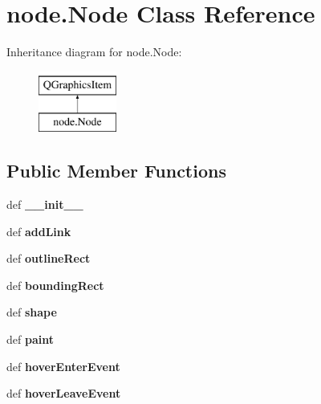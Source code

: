 \hypertarget{classnode_1_1Node}{\section{node.\-Node Class Reference}
\label{classnode_1_1Node}
}
Inheritance diagram for node.\-Node\-:\begin{figure}[H]
\begin{center}
\leavevmode
\includegraphics[height=2.000000cm]{classnode_1_1Node}
\end{center}
\end{figure}
\subsection*{Public Member Functions}
\begin{DoxyCompactItemize}
\item 
\hypertarget{classnode_1_1Node_a86b4ae5dcdb995a5e2bba666f293ee09}{def {\bfseries \-\_\-\-\_\-init\-\_\-\-\_\-}}\label{classnode_1_1Node_a86b4ae5dcdb995a5e2bba666f293ee09}

\item 
\hypertarget{classnode_1_1Node_a44ba0bb4fbf7cb938914fde718b95eaf}{def {\bfseries add\-Link}}\label{classnode_1_1Node_a44ba0bb4fbf7cb938914fde718b95eaf}

\item 
\hypertarget{classnode_1_1Node_acb0f95f8e8177684fef0cc87e2efaef1}{def {\bfseries outline\-Rect}}\label{classnode_1_1Node_acb0f95f8e8177684fef0cc87e2efaef1}

\item 
\hypertarget{classnode_1_1Node_aa0c2794b55b475150d0413eaccbaa540}{def {\bfseries bounding\-Rect}}\label{classnode_1_1Node_aa0c2794b55b475150d0413eaccbaa540}

\item 
\hypertarget{classnode_1_1Node_a61934863f948045d4285d6085e0004b4}{def {\bfseries shape}}\label{classnode_1_1Node_a61934863f948045d4285d6085e0004b4}

\item 
\hypertarget{classnode_1_1Node_a3d9932b8281adf416950cd91365f2a88}{def {\bfseries paint}}\label{classnode_1_1Node_a3d9932b8281adf416950cd91365f2a88}

\item 
\hypertarget{classnode_1_1Node_adf86d938fa416bf8c53836db66927349}{def {\bfseries hover\-Enter\-Event}}\label{classnode_1_1Node_adf86d938fa416bf8c53836db66927349}

\item 
\hypertarget{classnode_1_1Node_a23110374d8666928aaac748c2d3bae1c}{def {\bfseries hover\-Leave\-Event}}\label{classnode_1_1Node_a23110374d8666928aaac748c2d3bae1c}

\end{DoxyCompactItemize}
